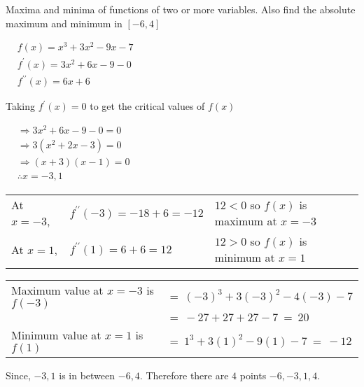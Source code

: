 \documentclass[12pt]{article}
\begin{document}

\textbf{\mred{\#}} Maxima and minima of functions of two or more variables. Also find the absolute maximum and minimum in $[-6,4]$


\begin{multicols}{2}
$\begin{aligned}
& f(x)=x^3+3 x^2-9 x-7 \\
& f^{\prime}(x)=3 x^2+6 x-9-0 \\
& f^{\prime \prime}(x)=6 x+6
\end{aligned}$

\columnbreak

Taking $f^{\prime}(x)=0$ to get the critical values of $f(x)$

   $\begin{aligned}
      & \Rightarrow 3 x^2+6 x-9-0 = 0 \\
      & \Rightarrow 3(x^2+2 x-3) = 0 \\
      & \Rightarrow (x+3)(x-1) = 0 \\
      & \therefore x = -3,1
   \end{aligned}$
\end{multicols}

\begin{tabular}{lll}
   At $x=-3$, & $f^{\prime \prime}(-3)=-18+6=-12$ & $12<0$ \quad so $f(x)$ is maximum at $x=-3$\\
   At $x=1$, & $f^{\prime \prime}(1)=6+6=12$ & $12>0$ \quad so $f(x)$ is minimum at $x=1$
\end{tabular}

\begin{tabular}{ll}
   Maximum value at $x=-3$ is $f(-3)$ & $= \ (-3)^3+3(-3)^2-4(-3)-7$\\
   & $= \ -27+27+27-7 \ = \ 20$\\
   Minimum value at $x=1$ is $f(1)$ & $= \ 1^3+3(1)^2-9(1)-7 \ = \ -12$
\end{tabular}


Since, $-3,1$ is in between $-6,4$. Therefore there are $4$ points $-6,-3,1,4$.

\vspace{-0.5\baselineskip}
\begin{center}
\end{center}
\end{document}
